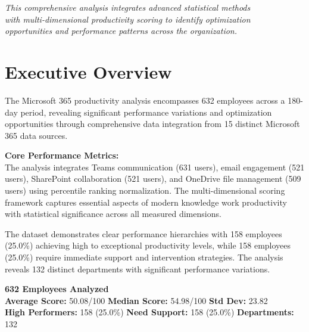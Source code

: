 \documentclass[12pt,a4paper]{article}
\begin{document}
\begin{titlepage}
    \vspace{0.8cm}
    
    {\fontsize{11}{14}\selectfont\color{mediumGray}\textit{
    This comprehensive analysis integrates advanced statistical methods\\
    with multi-dimensional productivity scoring to identify optimization\\
    opportunities and performance patterns across the organization.
    }}
    
\end{titlepage}

\newpage

\section{Executive Overview}

The Microsoft 365 productivity analysis encompasses 632 employees across a 180-day period, revealing significant performance variations and optimization opportunities through comprehensive data integration from 15 distinct Microsoft 365 data sources.

\begin{highlightbox}
\textbf{\faChartLine \quad Core Performance Metrics:}\\[0.5em]
The analysis integrates Teams communication (631 users), email engagement (521 users), SharePoint collaboration (521 users), and OneDrive file management (509 users) using percentile ranking normalization. The multi-dimensional scoring framework captures essential aspects of modern knowledge work productivity with statistical significance across all measured dimensions.
\end{highlightbox}

The dataset demonstrates clear performance hierarchies with 158 employees (25.0\%) achieving high to exceptional productivity levels, while 158 employees (25.0\%) require immediate support and intervention strategies. The analysis reveals 132 distinct departments with significant performance variations.

\begin{statsbox}
\begin{center}
\Large\color{primaryGold}
\textbf{632 Employees Analyzed}\\
\vspace{0.6em}
\normalsize\color{darkGray}
\textbf{Average Score:} 50.08/100 \quad \textbf{Median Score:} 54.98/100 \quad \textbf{Std Dev:} 23.82\\[0.4em]
\textbf{High Performers:} 158 (25.0\%) \quad \textbf{Need Support:} 158 (25.0\%) \quad \textbf{Departments:} 132
\end{center}
\end{statsbox}
\end{document}
